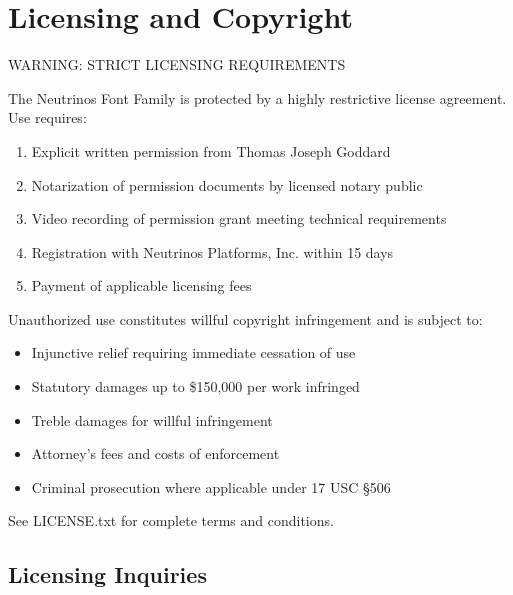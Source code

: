 \documentclass[11pt,letterpaper]{article}
\begin{document}
\newpage


\section{Licensing and Copyright}

\begin{tcolorbox}[colback=radionred!10,colframe=radionred,title={\blackfont HIGHLY RESTRICTIVE LICENSE}]
{\semiboldfont WARNING: STRICT LICENSING REQUIREMENTS}

The Neutrinos Font Family is protected by a highly restrictive license agreement. Use requires:

\begin{enumerate}
    \item Explicit written permission from Thomas Joseph Goddard
    \item Notarization of permission documents by licensed notary public
    \item Video recording of permission grant meeting technical requirements
    \item Registration with Neutrinos Platforms, Inc. within 15 days
    \item Payment of applicable licensing fees
\end{enumerate}

Unauthorized use constitutes willful copyright infringement and is subject to:

\begin{itemize}
    \item Injunctive relief requiring immediate cessation of use
    \item Statutory damages up to \$150,000 per work infringed
    \item Treble damages for willful infringement
    \item Attorney's fees and costs of enforcement
    \item Criminal prosecution where applicable under 17 USC \S506
\end{itemize}

See LICENSE.txt for complete terms and conditions.
\end{tcolorbox}

\subsection{Licensing Inquiries}
\end{document}
